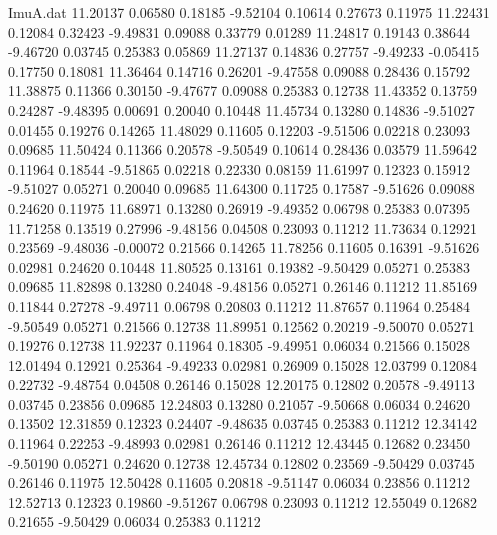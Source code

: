 \begin{filecontents}{ImuA.dat}
  11.20137    0.06580    0.18185   -9.52104    0.10614    0.27673    0.11975
  11.22431    0.12084    0.32423   -9.49831    0.09088    0.33779    0.01289
  11.24817    0.19143    0.38644   -9.46720    0.03745    0.25383    0.05869
  11.27137    0.14836    0.27757   -9.49233   -0.05415    0.17750    0.18081
  11.36464    0.14716    0.26201   -9.47558    0.09088    0.28436    0.15792
  11.38875    0.11366    0.30150   -9.47677    0.09088    0.25383    0.12738
  11.43352    0.13759    0.24287   -9.48395    0.00691    0.20040    0.10448
  11.45734    0.13280    0.14836   -9.51027    0.01455    0.19276    0.14265
  11.48029    0.11605    0.12203   -9.51506    0.02218    0.23093    0.09685
  11.50424    0.11366    0.20578   -9.50549    0.10614    0.28436    0.03579
  11.59642    0.11964    0.18544   -9.51865    0.02218    0.22330    0.08159
  11.61997    0.12323    0.15912   -9.51027    0.05271    0.20040    0.09685
  11.64300    0.11725    0.17587   -9.51626    0.09088    0.24620    0.11975
  11.68971    0.13280    0.26919   -9.49352    0.06798    0.25383    0.07395
  11.71258    0.13519    0.27996   -9.48156    0.04508    0.23093    0.11212
  11.73634    0.12921    0.23569   -9.48036   -0.00072    0.21566    0.14265
  11.78256    0.11605    0.16391   -9.51626    0.02981    0.24620    0.10448
  11.80525    0.13161    0.19382   -9.50429    0.05271    0.25383    0.09685
  11.82898    0.13280    0.24048   -9.48156    0.05271    0.26146    0.11212
  11.85169    0.11844    0.27278   -9.49711    0.06798    0.20803    0.11212
  11.87657    0.11964    0.25484   -9.50549    0.05271    0.21566    0.12738
  11.89951    0.12562    0.20219   -9.50070    0.05271    0.19276    0.12738
  11.92237    0.11964    0.18305   -9.49951    0.06034    0.21566    0.15028
  12.01494    0.12921    0.25364   -9.49233    0.02981    0.26909    0.15028
  12.03799    0.12084    0.22732   -9.48754    0.04508    0.26146    0.15028
  12.20175    0.12802    0.20578   -9.49113    0.03745    0.23856    0.09685
  12.24803    0.13280    0.21057   -9.50668    0.06034    0.24620    0.13502
  12.31859    0.12323    0.24407   -9.48635    0.03745    0.25383    0.11212
  12.34142    0.11964    0.22253   -9.48993    0.02981    0.26146    0.11212
  12.43445    0.12682    0.23450   -9.50190    0.05271    0.24620    0.12738
  12.45734    0.12802    0.23569   -9.50429    0.03745    0.26146    0.11975
  12.50428    0.11605    0.20818   -9.51147    0.06034    0.23856    0.11212
  12.52713    0.12323    0.19860   -9.51267    0.06798    0.23093    0.11212
  12.55049    0.12682    0.21655   -9.50429    0.06034    0.25383    0.11212

\end{filecontents}
